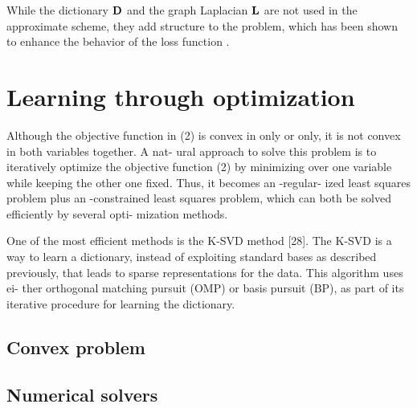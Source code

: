 While the dictionary $\mathbf{D}$ and the graph Laplacian $\mathbf{L}$ are not used in the approximate scheme, they add structure to the problem, which has been shown to enhance the behavior of the loss function \cite{kowalski2009sparse, baraniuk2010modelCS, huang2011LearningStructuredSparsity, jenatton2011structured}.




\chapter{Learning through optimization} \label{chap:learning}

Although the objective function in (2) is convex in only
or only, it is not convex in both variables together. A nat-
ural approach to solve this problem is to iteratively optimize the
objective function (2) by minimizing over one variable while
keeping the other one fixed. Thus, it becomes an -regular-
ized least squares problem plus an -constrained least squares
problem, which can both be solved efficiently by several opti-
mization methods.

One of the most efficient methods is the K-SVD method [28]. The K-SVD is a way to learn a dictionary, instead of exploiting standard bases as described previously, that leads to sparse representations for the data. This algorithm uses ei- ther orthogonal matching pursuit (OMP) or basis pursuit (BP), as part of its iterative procedure for learning the dictionary.

\section{Convex problem}

\section{Numerical solvers}

